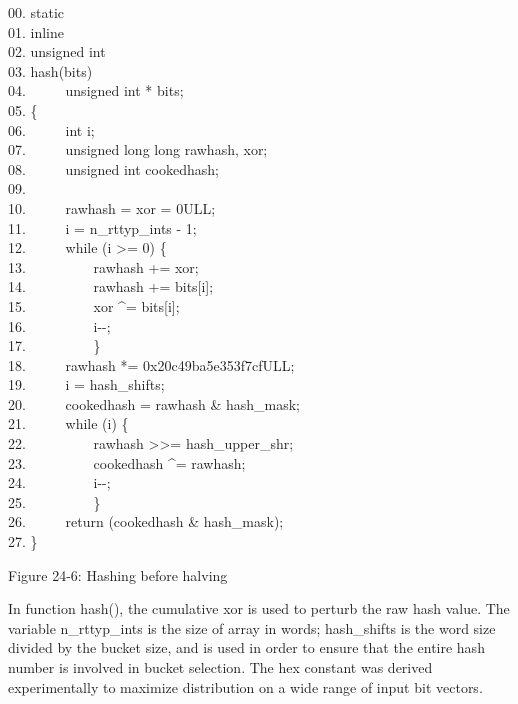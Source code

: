 \begin{iconcode}
00. static \\
01. inline \\
02. unsigned int \\
03. hash(bits) \\
04. \ \ \ \ \ unsigned int * bits; \\
05. \{ \\
06. \ \ \ \ \ int i; \\
07. \ \ \ \ \ unsigned long long rawhash, xor; \\
08. \ \ \ \ \ unsigned int cookedhash; \\
09. \\
10. \ \ \ \ \ rawhash = xor = 0ULL; \\
11. \ \ \ \ \ i = n\_rttyp\_ints - 1; \\
12. \ \ \ \ \ while (i {\textgreater}= 0) \{ \\
13. \ \ \ \ \ \ \ \ \ rawhash += xor; \\
14. \ \ \ \ \ \ \ \ \ rawhash += bits[i]; \\
15. \ \ \ \ \ \ \ \ \ xor \^{}= bits[i]; \\
16. \ \ \ \ \ \ \ \ \ i-{}-; \\
17. \ \ \ \ \ \ \ \ \ \} \\
18. \ \ \ \ \ rawhash *= 0x20c49ba5e353f7cfULL; \\
19. \ \ \ \ \ i = hash\_shifts; \\
20. \ \ \ \ \ cookedhash = rawhash \& hash\_mask; \\
21. \ \ \ \ \ while (i) \{ \\
22. \ \ \ \ \ \ \ \ \ rawhash {\textgreater}{\textgreater}= hash\_upper\_shr; \\
23. \ \ \ \ \ \ \ \ \ cookedhash \^{}= rawhash; \\
24. \ \ \ \ \ \ \ \ \ i-{}-; \\
25. \ \ \ \ \ \ \ \ \ \} \\
26. \ \ \ \ \ return (cookedhash \& hash\_mask); \\
27. \}
\end{iconcode}

{\centering Figure 24-6: Hashing before halving
\par}

In function \textsf{hash()}, the cumulative \textsf{xor} is used to
perturb the raw hash value. The variable \textsf{n\_rttyp\_ints} is
the size of array in words; \textsf{hash\_shifts} is the word size
divided by the bucket size, and is used in order to ensure that the
entire hash number is involved in bucket selection. The hex constant
was derived experimentally to maximize distribution on a wide range of
input bit vectors.


